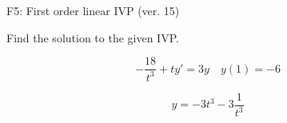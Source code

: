 \begin{exercise}
  \begin{exerciseTitle}F5: First order linear IVP (ver. 15)\end{exerciseTitle}
  \begin{exerciseStatement}
    
Find the solution to the given IVP.

    
\[-\frac{18}{t^{3}} +ty'= 3 y \hspace{1em} y( 1 ) = -6\]

  \end{exerciseStatement}
  \begin{exerciseAnswer}
    
\[y= -3 t^ 3 -3 \frac{1}{t^{3}}\]

  \end{exerciseAnswer}
\end{exercise}